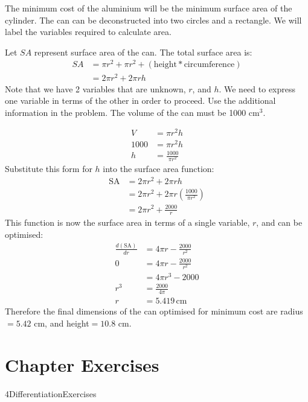 \solution The minimum cost of the aluminium will be the minimum surface area of the cylinder. The can can be deconstructed into two circles and a rectangle. We will label the variables required to calculate area.

Let $SA$ represent surface area of the can. The total surface area is:
\begin{align*}
SA&=\pi r^2 + \pi r^2 + \left(\textrm{height}*\textrm{circumference}\right)\\
&=2\pi r^2+2\pi rh
\end{align*}
Note that we have 2 variables that are unknown, $r$, and $h$. We need to express one variable in terms of the other in order to proceed. Use the additional information in the problem. The volume of the can must be 1000 cm$^3$.
\begin{multicols}{2}
\begin{align*}
V&=\pi r^2 h\\
1000&=\pi r^2 h\\
h&=\frac{1000}{\pi r^2}
\end{align*}
Substitute this form for $h$ into the surface area function:
\begin{align*}
\text{SA}&=2\pi r^2+2\pi rh\\
&=2\pi r^2+2\pi r\left(\frac{1000}{\pi r^2} \right)\\
&=2\pi r^2+\frac{2000}{r}
\end{align*}
This function is now the surface area in terms of a single variable, $r$, and can be optimised:
\begin{align*}
\frac{d(\text{SA})}{dr}&=4\pi r-\frac{2000}{r^2}\\
0&=4\pi r-\frac{2000}{r^2}\\
&=4\pi r^3-2000\\
r^3&=\frac{2000}{4\pi}\\
r&=5.419 \,\textrm{cm}
\end{align*}
Therefore the final dimensions of the can optimised for minimum cost are radius$=5.42$ cm, and height$=10.8$ cm.
\end{multicols}




 \section{Chapter Exercises}
 {4DifferentiationExercises}
